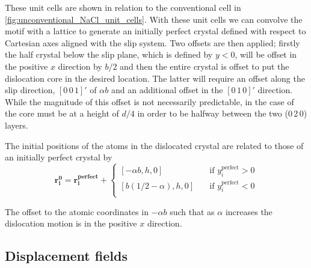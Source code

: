 These unit cells are shown in relation to the conventional cell in \autoref{fig:unconventional_NaCl_unit_cells}. With these unit cells we can convolve the motif with a lattice to generate an initially perfect crystal defined with respect to Cartesian axes aligned with the slip system. Two offsets are then applied; firstly the half crystal below the slip plane, which is defined by $y < 0$, will be offset in the positive $x$ direction by $b/2$ and then the entire crystal is offset to put the dislocation core in the desired location. The latter will require an offset along the slip direction, $[0\,0\,1]'$ of $\alpha b$ and an additional offset in the $[0\,1\,0]'$ direction. While the magnitude of this offset is not necessarily predictable, in the case of  the core must be at a height of $d/4$ in order to be halfway between the two (0\,2\,0) layers.

The initial positions of the atoms in the dislocated crystal are related to those of an initially perfect crystal by
\begin{equation}
\bm{r_i^0} = \bm{r_i^{\text{perfect}}} +\begin{cases}
[-\alpha{}b, h, 0] & \quad \text{if } y_i^{\text{perfect}} > 0\\
[b(1/2 - \alpha{}), h, 0] & \quad \text{if } y_i^{\text{perfect}} < 0\\
\end{cases} 
\end{equation}

The offset to the atomic coordinates in $-\alpha{}b$ such that as $\alpha$ increases the dislocation motion is in the positive $x$ direction.





\FloatBarrier














\subsection{Displacement fields}

